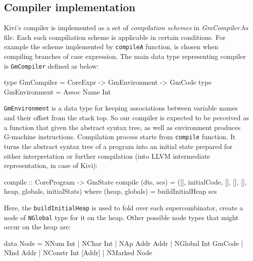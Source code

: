 \documentclass[12pt,a4paper]{report}
\begin{document}

%
%

\subsection{Compiler implementation}
Kivi's compiler is implemented as a set of \textit{compilation schemes} in
\textit{GmCompiler.hs} file. Each such compiliation scheme is applicable in
certain conditions. For example the scheme implemented by \texttt{compileA}
function, is chosen when compiling branches of case expression. The main data
type representing compiler is \texttt{GmCompiler} defined as below:

\vspace*{0.2in}
\begin{code}[style=haskell]
type GmCompiler = CoreExpr -> GmEnvironment -> GmCode
type GmEnvironment = Assoc Name Int
\end{code}

\texttt{GmEnvironment} is a data type for keeping associations between variable
names and their offset from the stack top. So our compiler is expected to be
perceived as a function that given the abstract syntax tree, as well as
environment produces G-machine instructions. Compilation process starts from
\texttt{compile} function. It turns the abstract syntax tree of a program into
an initial state prepared for either interpretation or further compilation (into
LLVM intermediate representation, in case of Kivi):

\vspace*{0.2in}
\begin{code}[style=haskell]
compile :: CoreProgram -> GmState
compile (dts, scs) = ([], initialCode, [], [], [], heap, globals, initialStats)
    where
        (heap, globals) = buildInitialHeap scs
\end{code}

Here, the \texttt{buildInitialHeap} is used to fold over each supercombinator,
create a node of \texttt{NGlobal} type for it on the heap. Other possible node
types that might occur on the heap are:

\vspace*{0.2in}
\begin{code}[style=haskell]
data Node = NNum Int
          | NChar Int
          | NAp Addr Addr
          | NGlobal Int GmCode
          | NInd Addr
          | NConstr Int [Addr]
          | NMarked Node
\end{code}
\end{document}
